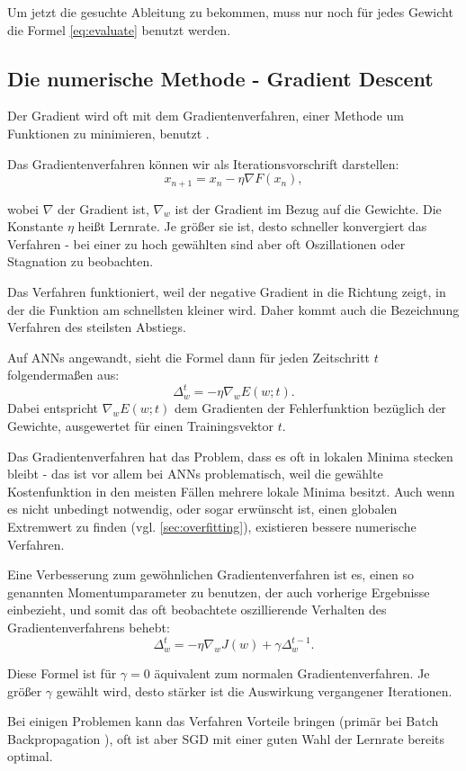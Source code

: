 Um jetzt die gesuchte Ableitung zu bekommen, muss nur noch für jedes Gewicht die Formel \ref{eq:evaluate} benutzt werden. 

\subsection{Die numerische Methode - Gradient Descent}

Der Gradient wird oft mit dem Gradientenverfahren, einer Methode um Funktionen zu minimieren, benutzt \cite{bishop1995neural,bengio2012practical}.

Das Gradientenverfahren können wir als Iterationsvorschrift darstellen:
\begin{equation}
x_{n+1}=x_n- \eta  \nabla F(x_n), 
\end{equation}

wobei $\nabla$ der Gradient ist, $\nabla_w$ ist der Gradient im Bezug auf die Gewichte. 
Die Konstante $\eta$ heißt Lernrate. Je größer sie ist, desto schneller konvergiert das Verfahren - bei einer zu hoch gewählten sind aber oft Oszillationen oder Stagnation zu beobachten. 

Das Verfahren funktioniert, weil der negative Gradient in die Richtung zeigt, in der die Funktion am schnellsten kleiner wird. Daher kommt auch die Bezeichnung Verfahren des steilsten Abstiegs.

Auf ANNs angewandt, sieht die Formel dann für jeden Zeitschritt $t$ folgendermaßen aus:
\begin{equation}
  \Delta_w^t = - \eta  \nabla_w E(w;t).
\end{equation}
Dabei entspricht $\nabla_w E(w;t)$ dem Gradienten der Fehlerfunktion bezüglich der Gewichte, ausgewertet für einen Trainingsvektor $t$.

Das Gradientenverfahren hat das Problem, dass es oft in lokalen Minima stecken bleibt - das ist vor allem bei ANNs problematisch, weil die gewählte Kostenfunktion in den meisten Fällen mehrere lokale Minima besitzt. Auch wenn es nicht unbedingt notwendig, oder sogar erwünscht ist, einen globalen Extremwert zu finden (vgl. \ref{sec:overfitting}), existieren bessere numerische Verfahren. 

Eine Verbesserung zum gewöhnlichen Gradientenverfahren ist es, einen so genannten Momentumparameter zu benutzen, der auch vorherige Ergebnisse einbezieht, und somit das oft beobachtete oszillierende Verhalten des Gradientenverfahrens behebt:
\begin{equation}
 \Delta_w^t = - \eta  \nabla_w J(w) + \gamma \Delta_w^{t-1}.
\end{equation}

Diese Formel ist für $\gamma = 0$ äquivalent zum normalen Gradientenverfahren. Je größer $\gamma$ gewählt wird, desto stärker ist die Auswirkung vergangener Iterationen. 

Bei einigen Problemen kann das Verfahren Vorteile bringen (primär bei Batch Backpropagation \cite{lecunefficient}), oft ist aber SGD mit einer guten Wahl der Lernrate bereits optimal\cite{bengio2012practical}.
